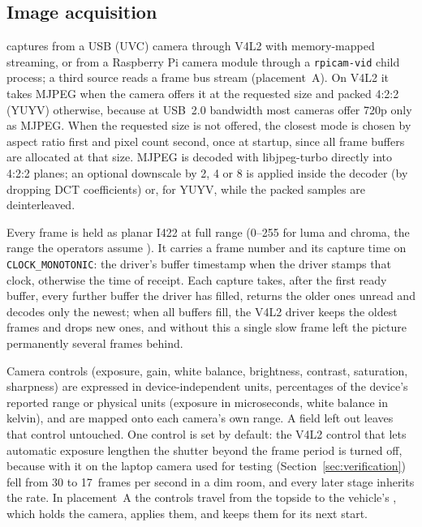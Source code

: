 \subsection{Image acquisition}\label{sec:capture}

\eeye{} captures from a USB (UVC) camera through V4L2 \cite{v4l2}
with memory-mapped
streaming, or from a Raspberry Pi camera module through a \texttt{rpicam-vid}
\cite{rpicamapps} child process; a third source reads a frame bus stream
(placement~A). On V4L2 it takes MJPEG when the camera offers it at
the requested size
and packed 4:2:2 (YUYV) otherwise, because at USB~2.0 bandwidth most
cameras offer
720p only as MJPEG. When the requested size is not offered, the
closest mode is chosen
by aspect ratio first and pixel count second, once at startup, since
all frame buffers
are allocated at that size. MJPEG is decoded with libjpeg-turbo
\cite{libjpegturbo}
directly into 4:2:2 planes; an optional downscale by 2, 4 or 8 is
applied inside the
decoder (by dropping DCT coefficients) or, for YUYV, while the packed
samples are
deinterleaved.

Every frame is held as planar I422 at full range (0--255 for luma and
  chroma, the range
the operators assume \cite{itu_bt601}). It carries a frame number and
its capture
time on \texttt{CLOCK\_MONOTONIC}: the driver's buffer timestamp when the driver
stamps that clock, otherwise the time of receipt. Each capture takes,
after the first
ready buffer, every further buffer the driver has filled, returns the older ones
unread and decodes only the newest; when all buffers fill, the V4L2
driver keeps the
oldest frames and drops new ones, and without this a single slow frame left the
picture permanently several frames behind.

Camera controls (exposure, gain, white balance, brightness, contrast,
  saturation,
sharpness) are expressed in device-independent units, percentages of
the device's
reported range or physical units (exposure in microseconds, white
balance in kelvin),
and are mapped onto each camera's own range. A field left out leaves
that control
untouched. One control is set by default: the V4L2 control that lets automatic
exposure lengthen the shutter beyond the frame period is turned off,
because with it
on the laptop camera used for testing
(Section~\ref{sec:verification}) fell from 30 to
17~frames per second in a dim room, and every later stage inherits the rate. In
placement~A the controls travel from the topside to the vehicle's
\hellion{}, which
holds the camera, applies them, and keeps them for its next start.
